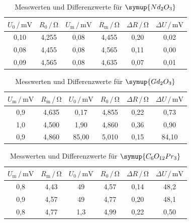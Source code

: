 \begin{table}
\centering
\caption{Messwerten und Differenzwerte für $\symup{Nd_2O_3}$}
\label{tab:Messdaten4}
\begin{tabular}{c c c c c c}
\toprule
$U_\text{0} \,/\, \si{\milli\volt}$ & $R_\text{0} \,/\, \si{\ohm}$ & $U_\text{m} \,/\, \si{\milli\volt}$& $R_\text{m} \,/\, \si{\ohm}$ & $\Delta R \,/\, \si{\ohm}$ & $\Delta U \,/\, \si{\milli\volt}$\\
\midrule
0,10 & 4,255 & 0,08 & 4,455 & 0,20 & 0,02\\
0,08 & 4,455 & 0,08 & 4,565 & 0,11 & 0,00\\
0,09 & 4,565 & 0,08 & 4,635 & 0,07 & 0,01\\
\bottomrule
\end{tabular}
\end{table}

\begin{table}
\centering
\caption{Messwerten und Differenzwerte für $\symup{Gd_2O_3}$}
\label{tab:Messdaten5}
\begin{tabular}{c c c c c c}
\toprule
$U_\text{m} \,/\, \si{\milli\volt}$ & $R_\text{m} \,/\, \si{\ohm}$ & $U_\text{0} \,/\, \si{\milli\volt}$& $R_\text{0} \,/\, \si{\ohm}$ & $\Delta R \,/\, \si{\ohm}$ & $\Delta U \,/\, \si{\milli\volt}$\\
\midrule
0,9 & 4,635 &  0,17 & 4,855 & 0,22 &  0,73\\
1,0 & 4,500 &  1,90 & 4,860 & 0,36 &  0,90\\
0,9 & 4,860 & 85,00 & 5,010 & 0,15 & 84,10\\
\bottomrule
\end{tabular}
\end{table}

\begin{table}
\centering
\caption{Messwerten und Differenzwerte für $\symup{C_6O_{12}Pr_3}$}
\label{tab:Messdaten6}
\begin{tabular}{c c c c c c}
\toprule
$U_\text{m} \,/\, \si{\milli\volt}$ & $R_\text{m} \,/\, \si{\ohm}$ & $U_\text{0} \,/\, \si{\milli\volt}$& $R_\text{0} \,/\, \si{\ohm}$ & $\Delta R \,/\, \si{\ohm}$ &$\Delta U \,/\, \si{\milli\volt}$ \\
\midrule
0,8 & 4,43 &  49 & 4,57 & 0,14 & 48,2\\
0,9 & 4,57 &  49 & 4,77 & 0,20 & 48,1\\
0,8 & 4,77 & 1,3 & 4,99 & 0,22 & 0,50\\
\bottomrule
\end{tabular}
\end{table}


